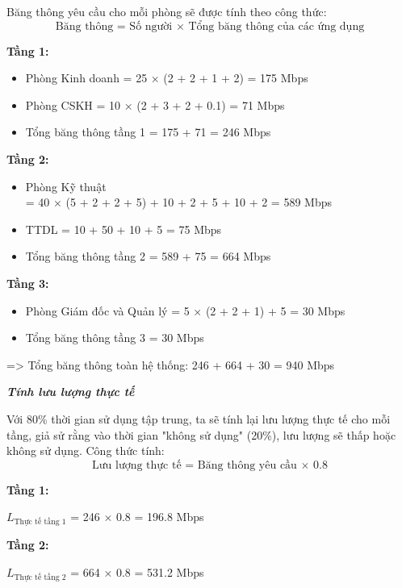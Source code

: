 Băng thông yêu cầu cho mỗi phòng sẽ được tính theo công thức:
\begin{equation}
    \text{Băng thông = Số người × Tổng băng thông của các ứng dụng}
\end{equation}

\textbf{Tầng 1:}
\begin{itemize}[left=2cm]
    \item Phòng Kinh doanh = 25 × (2 + 2 + 1 +  2) = 175 Mbps
    \item Phòng CSKH = 10 × (2 + 3 + 2 + 0.1) = 71 Mbps
    \item Tổng băng thông tầng 1 = 175 + 71 = 246 Mbps
\end{itemize}

\textbf{Tầng 2:}
\begin{itemize}[left=2cm]
    \item Phòng Kỹ thuật \\= 40 × (5 + 2 + 2 + 5) + 10 + 2 + 5 + 10 + 2 = 589 Mbps
    \item TTDL = 10 + 50 + 10 + 5 = 75 Mbps
    \item Tổng băng thông tầng 2 = 589 + 75 = 664 Mbps
\end{itemize}

\textbf{Tầng 3:}
\begin{itemize}[left=2cm]
    \item Phòng Giám đốc và Quản lý = 5 × (2 + 2 + 1) + 5 = 30 Mbps
    \item Tổng băng thông tầng 3 = 30 Mbps
\end{itemize}

=> Tổng băng thông toàn hệ thống: 246 + 664 + 30 = 940 Mbps

\textit{\textbf{Tính lưu lượng thực tế}}

Với 80\% thời gian sử dụng tập trung, ta sẽ tính lại lưu lượng thực tế cho mỗi tầng, giả sử rằng vào thời gian "không sử dụng" (20\%), lưu lượng sẽ thấp hoặc không sử dụng. Công thức tính: 
\begin{equation}
    \text{Lưu lượng thực tế = Băng thông yêu cầu × 0.8}
\end{equation}

\textbf{Tầng 1:}
\begin{center}
    $L_{\text{Thực tế tầng 1}}$ = 246 × 0.8 = 196.8 Mbps
\end{center}
\newpage
\textbf{Tầng 2:}
\begin{center}
    $L_{\text{Thực tế tầng 2}}$ = 664 × 0.8 = 531.2 Mbps
\end{center}

